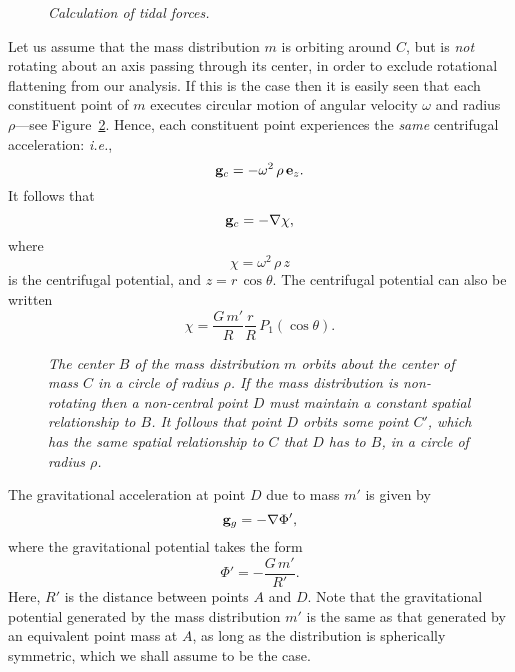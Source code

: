 \begin{figure}
\epsfysize=1.25in
\centerline{}
\caption{\em Calculation of tidal forces.}\label{ftide1}
\end{figure}

Let us assume that the mass distribution $m$ 
is orbiting around $C$, but  is {\em not}\/ rotating about
an axis passing through its center, in order to
exclude rotational flattening from our analysis. If this is the
case then it is easily seen that each constituent point of $m$ executes
circular motion of angular velocity $\omega$ and radius $\rho$---see Figure~\ref{fcirc}. Hence, each  constituent point experiences the {\em same}\/
centrifugal acceleration: {\em i.e.}, 
\begin{equation}
{\bf g}_c = - \omega^2\,\rho\,{\bf e}_z.
\end{equation}
 It follows that 
\begin{equation}
{\bf g}_c = - \nabla\chi,
\end{equation}
where
\begin{equation}
\chi =  \omega^2\,\rho\,z 
\end{equation}
is the centrifugal potential, and $z=r\,\cos\theta$. The centrifugal potential
can also be written
\begin{equation}
\chi = \frac{G\,m'}{R}\frac{r}{R}\,P_1(\cos\theta).
\end{equation}

\begin{figure}
\epsfysize=2.75in
\centerline{}
\caption{\em The center $B$ of the mass distribution $m$ orbits about the center of mass $C$ in a circle of radius $\rho$. If the mass distribution is non-rotating then a non-central point $D$ must maintain  a constant spatial relationship to $B$. It follows that point $D$ orbits some point $C'$, which has the same spatial relationship to $C$ that $D$ has to $B$, in a circle
of radius $\rho$.}\label{fcirc}
\end{figure}

The gravitational acceleration at point $D$ due to mass $m'$ is given by
\begin{equation}
{\bf g}_g = -\nabla\Phi',
\end{equation}
where the gravitational potential takes the form
\begin{equation}
\Phi' = -\frac{G\,m'}{R'}.
\end{equation}
Here, $R'$ is the distance between points $A$ and $D$. Note that the
gravitational potential generated by the mass distribution $m'$ is the
same as that generated by an equivalent point mass at $A$, as long
as the distribution is spherically symmetric, which we shall assume to
be the case.

